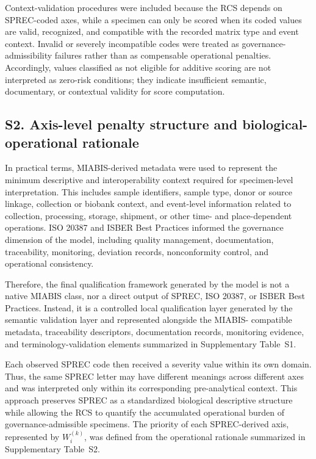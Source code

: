 \documentclass[preprint,12pt]{elsarticle}
\begin{document}
Context-validation procedures were included because the RCS depends on SPREC-coded axes, while a specimen can only be scored when its coded values 
are valid, recognized, and compatible with the recorded matrix type and event context. Invalid or severely incompatible codes were treated as 
governance-admissibility failures rather than as compensable operational penalties. Accordingly, values classified as not eligible for additive 
scoring are not interpreted as zero-risk conditions; they indicate insufficient semantic, documentary, or contextual validity for score computation.

\subsection*{S2. Axis-level penalty structure and biological-operational rationale}

In practical terms, MIABIS-derived metadata were used to represent the minimum descriptive and interoperability context required for specimen-level 
interpretation. This includes sample identifiers, sample type, donor or source linkage, collection or biobank context, and event-level information 
related to collection, processing, storage, shipment, or other time- and place-dependent operations. ISO 20387 and ISBER Best Practices informed the 
governance dimension of the model, including quality management, documentation, traceability, monitoring, deviation records, nonconformity control, 
and operational consistency.

Therefore, the final qualification framework generated by the model is not a native MIABIS class, nor a direct output of SPREC, ISO 20387, or ISBER 
Best Practices. Instead, it is a controlled local qualification layer generated by the semantic validation layer and represented alongside the MIABIS-
compatible metadata, traceability descriptors, documentation records, monitoring evidence, and terminology-validation elements summarized in 
Supplementary Table~S1.

Each observed SPREC code then received a severity value within its own domain. Thus, the same SPREC letter may have different meanings across 
different axes and was interpreted only within its corresponding pre-analytical context. This approach preserves SPREC as a standardized biological 
descriptive structure while allowing the RCS to quantify the accumulated operational burden of governance-admissible specimens. The priority of each 
SPREC-derived axis, represented by \(W_i^{(k)}\), was defined from the operational rationale summarized in Supplementary Table~S2. 
\end{document}
